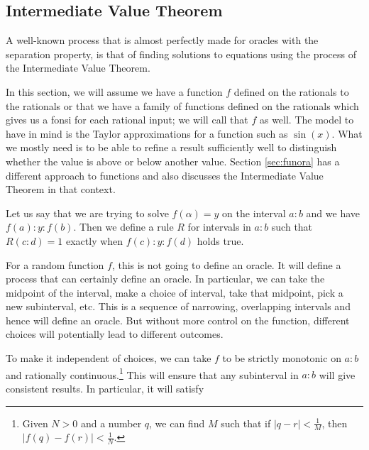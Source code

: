 \documentclass[12pt]{article}
\theoremstyle{remark}
\begin{document}
\subsection{Intermediate Value Theorem}

A well-known process that is almost perfectly made for oracles with the separation property, is that of finding solutions to equations using the process of the Intermediate Value Theorem. 

In this section, we will assume we have a function $f$ defined on the rationals to the rationals or that we have a family of functions defined on the rationals which gives us a fonsi for each rational input; we will call that $f$ as well. The model to have in mind is the Taylor approximations for a function such as $\sin(x)$. What we mostly need is to be able to refine a result sufficiently well to distinguish whether the value is above or below another value. Section \ref{sec:funora} has a different approach to functions and also discusses the Intermediate Value Theorem in that context. 

Let us say that we are trying to solve $f(\alpha) = y$ on the interval $a:b$ and we have $f(a):y:f(b)$. Then we define a rule $R$ for intervals in $a:b$ such that $R(c:d) = 1$ exactly when $f(c):y:f(d)$ holds true. 

For a random function $f$, this is not going to define an oracle. It will define a process that can certainly define an oracle. In particular, we can take the midpoint of the interval, make a choice of interval, take that midpoint, pick a new subinterval, etc. This is a sequence of narrowing, overlapping intervals and hence will define an oracle. But without more control on the function, different choices will potentially lead to different outcomes. 

To make it independent of choices, we can take $f$ to be strictly monotonic on $a:b$ and rationally continuous.\footnote{Given $N >0$ and a number $q$, we can find $M$ such that if $|q-r|<\frac{1}{M}$, then $|f(q)-f(r)| < \frac{1}{N}$.} This will ensure that any subinterval in $a:b$ will give consistent results. In particular, it will satisfy
\end{document}
